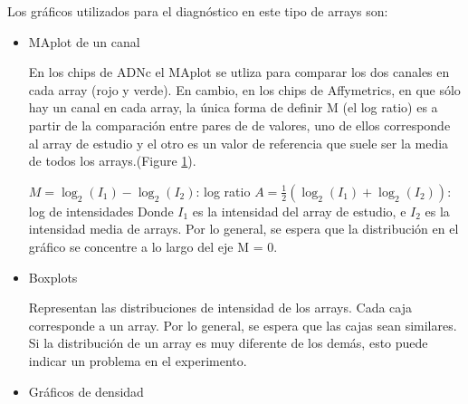 Los gr\'aficos utilizados para el diagn\'ostico en este tipo de arrays son:
\begin{itemize}
 \item MAplot de un canal

En los chips de ADNc el MAplot se utliza para comparar los dos canales en cada array (rojo y verde). En cambio, en
los chips de Affymetrics, en que s\'olo hay un canal en cada array,  la \'unica forma de definir M (el log ratio) es a partir de la comparaci\'on  entre pares de de valores, uno de ellos corresponde al array de estudio y el otro es un valor de referencia que suele ser la media de todos los arrays.(Figure \ref{c05MAPlotAffy}).



\vspace{-0.5cm}
\begin{figure}[!h]
\label{c05MAPlotAffy}
\end{figure}

$M=\log_2(I_1) - \log_2(I_2)$: log ratio
$A=\displaystyle \frac{1}{2}(\log_2 (I_1)+\log_2(I_2))$: log de intensidades
Donde $I_1$ es la intensidad del array de estudio, e $I_2$ es la intensidad media de arrays.
Por lo general, se espera que la distribuci\'on en el gr\'afico se concentre a lo largo del eje M = 0.


 \item Boxplots

Representan las distribuciones de intensidad de los arrays.
Cada caja corresponde a un array. Por lo general, se espera que las cajas sean similares. Si la distribuci\'on de un array es muy diferente de
los dem\'as, esto puede indicar un problema en el experimento.


\vspace{-0.5cm}
\begin{figure}[!h]
\label{c05BoxPlotAffy}
\end{figure}

 \item Gr\'aficos de densidad


\end{itemize}
